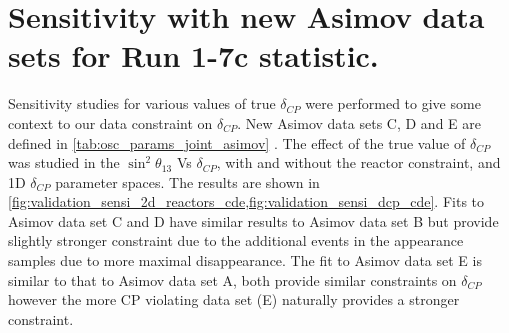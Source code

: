 \clearpage

\section {Sensitivity with new Asimov data sets for Run 1-7c statistic.}
\label{sec:sensi_new_asimov_run17c}

Sensitivity studies for various values of true $\delta_{CP}$ were performed to give some context to our data constraint on $\delta_{CP}$. New Asimov data sets C, D and E are defined in \cref{tab:osc_params_joint_asimov} .
The effect of the true value of $\delta_{CP}$ was studied in the $\sin^2 \theta_{13}$ Vs $\delta_{CP}$, with and without the reactor constraint, and 1D $\delta_{CP}$ parameter spaces. The results are shown in \cref{fig:validation_sensi_2d_reactors_cde,fig:validation_sensi_dcp_cde}. Fits to Asimov data set C and D have similar results 
to Asimov data set B but provide slightly stronger constraint due to the additional events in the appearance samples due to more maximal disappearance. The fit to Asimov data set E is similar to that to Asimov data set A, both provide similar constraints on $\delta_{CP}$ however the more CP violating data set (E) naturally provides a stronger constraint.

